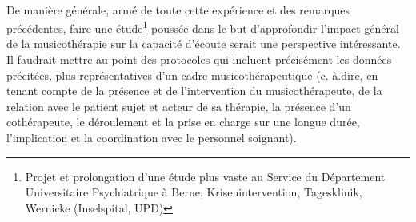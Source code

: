 \\
De manière générale, armé de toute cette expérience et des remarques précédentes, faire une 
étude\footnote{ Projet et
	prolongation d'une étude plus vaste au Service du
	Département Universitaire Psychiatrique à Berne, Krisenintervention,
	Tagesklinik, Wernicke (Inselspital, UPD) } poussée dans le but d'approfondir l'impact général de la
musicothérapie sur la capacité d'écoute serait une perspective intéressante. Il faudrait mettre au point 
des protocoles qui incluent précisément les données précitées, plus représentatives d'un cadre 
musicothérapeutique (c. à.dire, en tenant compte de la 
présence et de l'intervention du musicothérapeute, de la relation avec le patient sujet et acteur de sa 
thérapie, la présence d'un cothérapeute, le déroulement et la prise en charge sur une longue durée, 
l'implication et la coordination avec le personnel soignant).





















